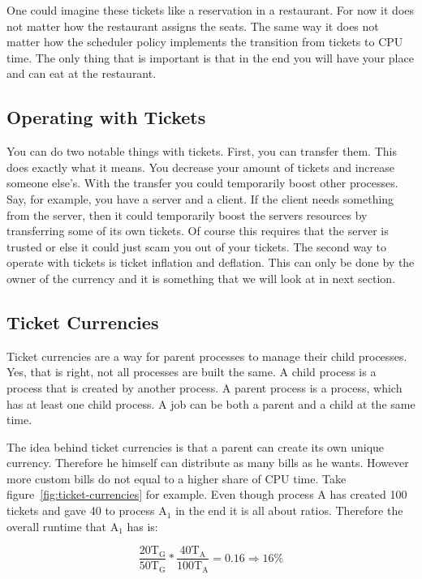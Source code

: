 One could imagine these tickets like a reservation in a restaurant. For now it does not matter how the restaurant assigns the seats.
The same way it does not matter how the scheduler policy implements the transition from tickets to CPU time. The only thing that is important is that in the end you will have your place and can eat at the restaurant.


\subsection{Operating with Tickets}

You can do two notable things with tickets. First, you can transfer them.
This does exactly what it means. You decrease your amount of tickets and increase someone else's. 
With the transfer you could temporarily boost other processes.
Say, for example, you have a server and a client.
If the client needs something from the server, then it could temporarily boost the servers resources by transferring some of its own tickets.
Of course this requires that the server is trusted or else it could just scam you out of your tickets.
The second way to operate with tickets is ticket inflation and deflation. This can only be done by the owner of the currency and it is something that we will look at in next section.

\subsection{Ticket Currencies}

Ticket currencies are a way for parent processes to manage their child processes.
Yes, that is right, not all processes are built the same.
A child process is a process that is created by another process.
A parent process is a process, which has at least one child process.
A job can be both a parent and a child at the same time.

The idea behind ticket currencies is that a parent can create its own unique currency. Therefore he himself can distribute as many bills as he wants.
However more custom bills do not equal to a higher share of CPU time.
Take figure~\ref{fig:ticket-currencies} for example. Even though process A has created 100 tickets and gave 40 to process A$_1$ in the end it is all about ratios.
Therefore the overall runtime that A$_1$ has is: 

$$\frac{20\text{T}_\text{G}}{50\text{T}_\text{G}} * \frac{40\text{T}_\text{A}}{100\text{T}_\text{A}} = 0.16 \Rightarrow 16\%$$

